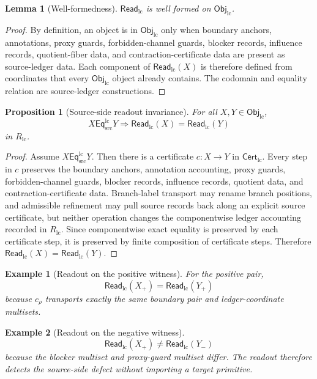 \documentclass[11pt]{article}
\newcommand{\EqLC}{\mathsf{Eq}_{\mathrm{src}}^{\mathrm{lc}}}
\newcommand{\ObjLC}{\mathsf{Obj}_{\mathrm{lc}}}
\newcommand{\CertLC}{\mathsf{Cert}_{\mathrm{lc}}}
\newcommand{\ReadLC}{\mathsf{Read}_{\mathrm{lc}}}
\newtheorem{examplecase}{Example}
\newtheorem{lemma}{Lemma}
\newtheorem{proposition}{Proposition}
\begin{document}
\begin{lemma}[Well-formedness]
\(\ReadLC\) is well formed on \(\ObjLC\).
\end{lemma}

\begin{proof}
By definition, an object is in \(\ObjLC\) only when boundary anchors,
annotations, proxy guards, forbidden-channel guards, blocker records,
influence records, quotient-fiber data, and contraction-certificate
data are present as source-ledger data. Each component of
\(\ReadLC(X)\) is therefore defined from coordinates that every
\(\ObjLC\) object already contains. The codomain and equality relation
are source-ledger constructions.
\end{proof}

\begin{proposition}[Source-side readout invariance]
For all \(X,Y\in\ObjLC\),
\[
    X\EqLC Y \Longrightarrow \ReadLC(X)=\ReadLC(Y)
\]
in \(R_{\mathrm{lc}}\).
\end{proposition}

\begin{proof}
Assume \(X\EqLC Y\). Then there is a certificate \(c:X\to Y\) in
\(\CertLC\). Every step in \(c\) preserves the boundary anchors,
annotation accounting, proxy guards, forbidden-channel guards, blocker
records, influence records, quotient data, and contraction-certificate
data. Branch-label transport may rename branch positions, and
admissible refinement may pull source records back along an explicit
source certificate, but neither operation changes the componentwise
ledger accounting recorded in \(R_{\mathrm{lc}}\). Since componentwise
exact equality is preserved by each certificate step, it is preserved
by finite composition of certificate steps. Therefore
\(\ReadLC(X)=\ReadLC(Y)\).
\end{proof}

\begin{examplecase}[Readout on the positive witness]
For the positive pair,
\[
    \ReadLC(X_+)=\ReadLC(Y_+)
\]
because \(c_{\rho}\) transports exactly the same boundary pair and
ledger-coordinate multisets.
\end{examplecase}

\begin{examplecase}[Readout on the negative witness]
\[
    \ReadLC(X_+)\neq \ReadLC(Y_-)
\]
because the blocker multiset and proxy-guard multiset differ. The
readout therefore detects the source-side defect without importing a
target primitive.
\end{examplecase}
\end{document}
